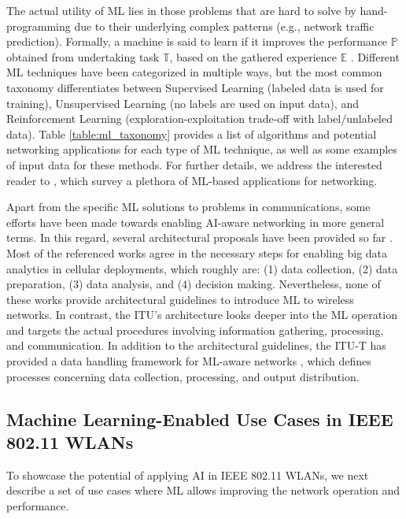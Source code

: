 \documentclass[twocolumn]{article}
\begin{document}
The actual utility of ML lies in those problems that are hard to solve by hand-programming due to their underlying complex patterns (e.g., network traffic prediction). Formally, a machine is said to learn if it improves the performance $\mathbb{P}$ obtained from undertaking task $\mathbb{T}$, based on the gathered experience $\mathbb{E}$ \cite{mitchell1997machine}. Different ML techniques have been categorized in multiple ways, but the most common taxonomy differentiates between Supervised Learning (labeled data is used for training), Unsupervised Learning (no labels are used on input data), and Reinforcement Learning (exploration-exploitation trade-off with label/unlabeled data). Table \ref{table:ml_taxonomy} provides a list of algorithms and potential networking applications for each type of ML technique, as well as some examples of input data for these methods. For further details, we address the interested reader to \cite{jiang2016machine, zhang2019deep, usama2019unsupervised}, which survey a plethora of ML-based applications for networking.

Apart from the specific ML solutions to problems in communications, some efforts have been made towards enabling AI-aware networking in more general terms. In this regard, several architectural proposals have been provided so far \cite{bi2015wireless,chih2017big,wang2018machine}. Most of the referenced works agree in the necessary steps for enabling big data analytics in cellular deployments, which roughly are: (1) data collection, (2) data preparation, (3) data analysis, and (4) decision making. Nevertheless, none of these works provide architectural guidelines to introduce ML to wireless networks. In contrast, the ITU's architecture looks deeper into the ML operation and targets the actual procedures involving information gathering, processing, and communication. In addition to the architectural guidelines, the ITU-T has provided a data handling framework for ML-aware networks \cite{itu2019data}, which defines processes concerning data collection, processing, and output distribution. 

\subsection{Machine Learning-Enabled Use Cases in IEEE 802.11 WLANs}
To showcase the potential of applying AI in IEEE 802.11 WLANs, we next describe a set of use cases where ML allows improving the network operation and performance.
\end{document}
